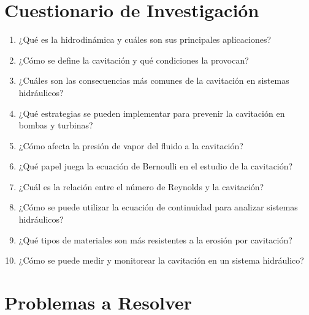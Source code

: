 \documentclass[../main]{subfiles}
\begin{document}
\section{Cuestionario de Investigación}

\begin{enumerate}
    \item ¿Qué es la hidrodinámica y cuáles son sus principales aplicaciones?
    \item ¿Cómo se define la cavitación y qué condiciones la provocan?
    \item ¿Cuáles son las consecuencias más comunes de la cavitación en sistemas hidráulicos?
    \item ¿Qué estrategias se pueden implementar para prevenir la cavitación en bombas y turbinas?
    \item ¿Cómo afecta la presión de vapor del fluido a la cavitación?
    \item ¿Qué papel juega la ecuación de Bernoulli en el estudio de la cavitación?
    \item ¿Cuál es la relación entre el número de Reynolds y la cavitación?
    \item ¿Cómo se puede utilizar la ecuación de continuidad para analizar sistemas hidráulicos?
    \item ¿Qué tipos de materiales son más resistentes a la erosión por cavitación?
    \item ¿Cómo se puede medir y monitorear la cavitación en un sistema hidráulico?

\end{enumerate}

\section{Problemas a Resolver}
\end{document}
